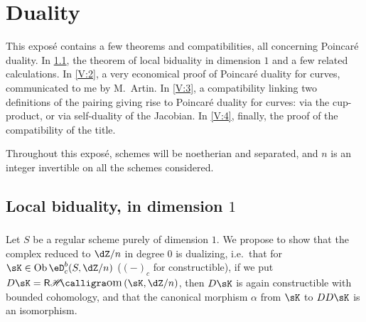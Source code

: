 
\chapter{Duality}\label{V}



















This expos\'e contains a few theorems and compatibilities, all
concerning Poincar\'e duality. In \ref{V:1}, the theorem of
local biduality in dimension $1$ \cite[I.5.1]{sga5} and a few
related calculations. In \ref{V:2}, a very economical proof of
Poincar\'e duality for curves, communicated to me by M.\ Artin. In
\ref{V:3}, a compatibility linking two definitions of the
pairing giving rise to Poincar\'e duality for curves: via the
cup-product, or via self-duality of the Jacobian. In \ref{V:4},
finally, the proof of the compatibility of the title.

Throughout this expos\'e, schemes will be noetherian and separated, and $n$
is an integer invertible on all the schemes considered.










\section{Local biduality, in dimension \texorpdfstring{$1$}{1}}\label{V:1}




\subsection{}\label{V:1-1}

Let $S$ be a regular scheme purely of dimension $1$. We propose
to show that the complex reduced to $\dZ/n$ in degree $0$ is
dualizing, i.e.\ that for $\sK\in \ob\eD_c^b(S,\dZ/n)$ ($(-)_c$ for
constructible), if we put $D\sK=\rHom(\sK,\dZ/n)$, then $D\sK$ is again
constructible with bounded cohomology, and that the canonical morphism $\alpha$
from $\sK$ to $D D\sK$ is an isomorphism.

